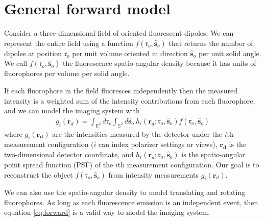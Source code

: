 \documentclass[11pt]{article}
\providecommand{\mb}[1]{\mathbf{#1}}
\providecommand{\ro}[1]{\mathbf{\mathfrak{r}}_o}
\providecommand{\so}[1]{\mathbf{\hat{s}}_o}
\providecommand{\rd}[1]{\mathbf{r}_d}
\begin{document}
\section{General forward model}
Consider a three-dimensional field of oriented fluorescent dipoles. We can
represent the entire field using a function $f(\ro{}, \so{})$ that returns the
number of dipoles at position $\ro{}$ per unit volume oriented in direction
$\so{}$ per unit solid angle. We call $f(\ro{}, \so{})$ the fluorescence
spatio-angular density because it has units of fluorophores per volume per solid
angle.

If each fluorophore in the field fluoresces independently then the measured
intensity is a weighted sum of the intensity contributions from each
fluorophore, and we can model the imaging system with
\begin{align}
  g_i(\rd{}) = \int_{\mathbb{R}^3}d\ro{} \int_{\mathbb{S}^2}d\so{}\ h_i(\rd{}; \ro{}, \so{})f(\ro{}, \so{})\label{eq:forward}
\end{align}
where $g_i(\mb{r_d})$ are the intensities measured by the detector under the
$i$th measurement configuration ($i$ can index polarizer settings or views),
$\mb{r_d}$ is the two-dimensional detector coordinate, and
$h_i(\rd{}; \ro{}, \so{})$ is the spatio-angular point spread function (PSF) of
the $i$th measurement configuration. Our goal is to reconstruct the object
$f(\ro{}, \so{})$ from intensity measurements $g_i(\rd{})$.

We can also use the spatio-angular density to model translating and rotating
fluorophores. As long as each fluorescence emission is an independent event,
then equation \ref{eq:forward} is a valid way to model the imaging system.
\end{document}
